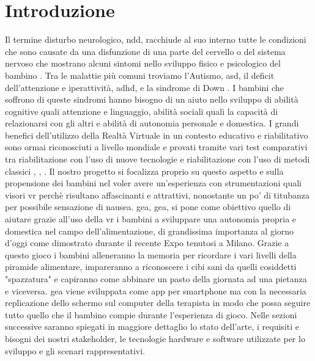 \section{Introduzione} \label{sec:intro}
Il termine disturbo neurologico, \acs{ndd}, racchiude al suo interno tutte le condizioni che sono causate da una disfunzione di una parte del cervello o del sistema nervoso che mostrano alcuni sintomi nello sviluppo fisico e psicologico del bambino \cite{rif1}. Tra le malattie più comuni troviamo l'Autismo, \acs{asd}, il deficit dell'attenzione e iperattività, \acs{adhd}, e la sindrome di Down \cite{rif2}. I bambini che soffrono di queste sindromi hanno bisogno di un aiuto nello sviluppo di abilità cognitive quali attenzione e linguaggio, abilità sociali quali la capacità di relazionarsi con gli altri e abilità di autonomia personale e domestica. I grandi benefici dell'utilizzo della Realtà Virtuale in un contesto educativo e riabilitativo sono ormai riconosciuti a livello mondiale e provati tramite vari test comparativi tra riabilitazione con l'uso di nuove tecnologie e riabilitazione con l'uso di metodi classici \cite{rif3}, \cite{rif4}, \cite{rif5}. Il nostro progetto si focalizza proprio su questo aspetto e sulla propensione dei bambini nel voler avere un'esperienza con strumentazioni quali visori \acs{vr} perchè risultano affascinanti e attrattivi, nonostante un po' di titubanza per possibile sensazione di nausea. \acs{gea}, \acl{gea}, si pone come obiettivo quello di aiutare grazie all'uso della \acs{vr} i bambini a sviluppare una autonomia propria e domestica nel campo dell'alimentazione, di grandissima importanza al giorno d'oggi come dimostrato durante il recente Expo tenutosi a Milano. Grazie a questo gioco i bambini alleneranno la memoria per ricordare i vari livelli della piramide alimentare, impareranno a riconoscere i cibi sani da quelli cosiddetti "spazzatura" e capiranno come abbinare un pasto della giornata ad una pietanza e viceversa. \acs{gea} viene sviluppata come app per smartphone ma con la necessaria replicazione dello schermo sul computer della terapista in modo che possa seguire tutto quello che il bambino compie durante l'esperienza di gioco. Nelle sezioni successive saranno spiegati in maggiore dettaglio lo stato dell'arte, i requisiti e bisogni dei nostri stakeholder, le tecnologie hardware e software utilizzate per lo sviluppo e gli scenari rappresentativi.